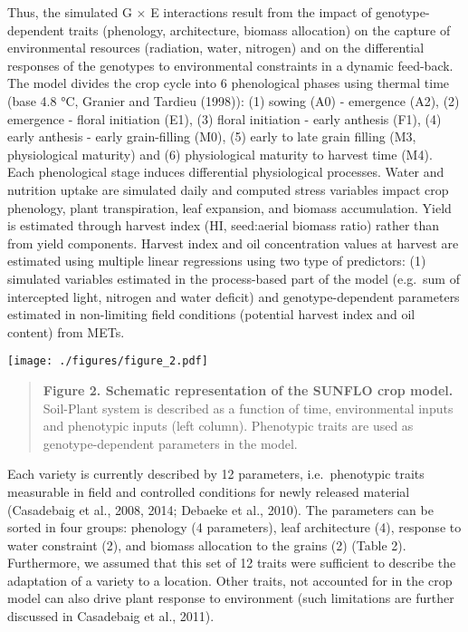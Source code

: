\documentclass[a4paper]{article}
\begin{document}
Thus, the simulated G \(\times\) E interactions result from the impact
of genotype-dependent traits (phenology, architecture, biomass
allocation) on the capture of environmental resources (radiation, water,
nitrogen) and on the differential responses of the genotypes to
environmental constraints in a dynamic feed-back. The model divides the
crop cycle into 6 phenological phases using thermal time (base 4.8 °C,
Granier and Tardieu (1998)): (1) sowing (A0) - emergence (A2), (2)
emergence - floral initiation (E1), (3) floral initiation - early
anthesis (F1), (4) early anthesis - early grain-filling (M0), (5) early
to late grain filling (M3, physiological maturity) and (6) physiological
maturity to harvest time (M4). Each phenological stage induces
differential physiological processes. Water and nutrition uptake are
simulated daily and computed stress variables impact crop phenology,
plant transpiration, leaf expansion, and biomass accumulation. Yield is
estimated through harvest index (HI, seed:aerial biomass ratio) rather
than from yield components. Harvest index and oil concentration values
at harvest are estimated using multiple linear regressions using two
type of predictors: (1) simulated variables estimated in the
process-based part of the model (e.g.~sum of intercepted light, nitrogen
and water deficit) and genotype-dependent parameters estimated in
non-limiting field conditions (potential harvest index and oil content)
from METs.

\texttt{[image: ./figures/figure\_2.pdf]}

\begin{quote}
\textbf{Figure 2. Schematic representation of the SUNFLO crop model.}
Soil-Plant system is described as a function of time, environmental
inputs and phenotypic inputs (left column). Phenotypic traits are used
as genotype-dependent parameters in the model.
\end{quote}

Each variety is currently described by 12 parameters, i.e.~phenotypic
traits measurable in field and controlled conditions for newly released
material (Casadebaig et al., 2008, 2014; Debaeke et al., 2010). The
parameters can be sorted in four groups: phenology (4 parameters), leaf
architecture (4), response to water constraint (2), and biomass
allocation to the grains (2) (Table 2). Furthermore, we assumed that
this set of 12 traits were sufficient to describe the adaptation of a
variety to a location. Other traits, not accounted for in the crop model
can also drive plant response to environment (such limitations are
further discussed in Casadebaig et al., 2011).
\end{document}
